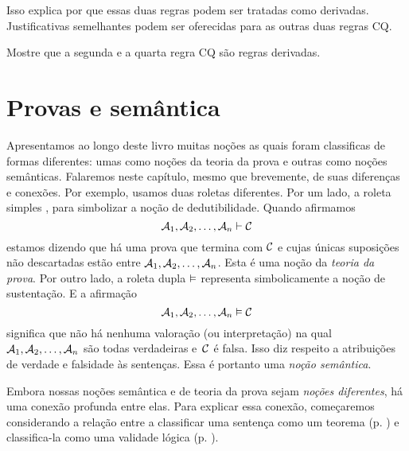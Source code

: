 \begin{fitchproof}
	\open
		\open
		\close
	\close
\end{fitchproof}
Isso explica por que essas duas regras podem ser tratadas como derivadas.  Justificativas semelhantes podem ser oferecidas para as outras duas regras CQ.

\practiceproblems

\problempart
Mostre que a segunda e a quarta regra  CQ são regras derivadas.


\chapter{Provas e semântica}

 Apresentamos ao longo deste livro muitas noções as quais foram classificas de formas diferentes: umas como noções da teoria da prova e outras como  noções semânticas.  Falaremos neste capítulo, mesmo que brevemente, de suas diferenças  e conexões. 
Por exemplo, usamos duas roletas diferentes.  Por um lado, a roleta simples  \proves,  para simbolizar a noção de dedutibilidade. Quando afirmamos 
$$\mathcal{A}_1, \mathcal{A}_2, \ldots, \mathcal{A}_n \vdash \mathcal{C}$$
estamos dizendo que há uma prova que termina com $\mathcal{C}$ e cujas únicas suposições não descartadas estão entre  $\mathcal{A}_1, \mathcal{A}_2, \ldots, \mathcal{A}_n$. Esta é uma noção da \emph{teoria da prova}.   Por outro lado,  a roleta  dupla  $\vDash$  representa simbolicamente a noção de sustentação. E a afirmação 
$$\mathcal{A}_1, \mathcal{A}_2, \ldots, \mathcal{A}_n \vDash \mathcal{C}$$
significa que não há nenhuma valoração (ou interpretação) na qual  $\mathcal{A}_1, \mathcal{A}_2, \ldots, \mathcal{A}_n$ são todas verdadeiras e~$\mathcal{C}$ é falsa. Isso diz respeito a atribuições de verdade e falsidade às sentenças. Essa é portanto uma \emph{noção semântica}.

Embora nossas noções semântica e de teoria da prova sejam \emph{noções diferentes}, há uma conexão profunda entre elas. Para explicar essa conexão, começaremos considerando a relação entre a classificar uma sentença como um teorema (p. \pageref{def:syntactic_tautology_in_sl}) e classifica-la como uma validade lógica (p. \pageref{def:validade_logica}).

